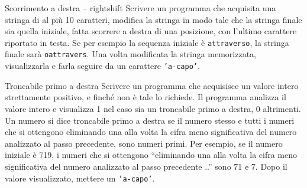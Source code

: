 \begin{labex}{Scorrimento a destra -- rightshift}
Scrivere un programma che acquisita una stringa di al pi\`u 10 caratteri, modifica la stringa in modo tale che la stringa finale sia quella iniziale, fatta scorrere a destra di una posizione, con l'ultimo carattere riportato in testa. Se per esempio la sequenza iniziale \`e \texttt{attraverso}, la stringa finale sar\`a \texttt{oattravers}. 
Una volta modificata la stringa memorizzata, visualizzarla e farla seguire da un carattere \texttt{'a-capo'}.

\begin{labexinout}
\end{labexinout}

\begin{labexcases}


\end{labexcases}


\end{labex}


\begin{labex}{Troncabile primo a destra}
Scrivere un programma che acquisisce un valore intero strettamente positivo, e finch\'e non \`e tale lo richiede. Il programma analizza il valore intero e visualizza 1 nel caso sia un troncabile primo a destra, 0 altrimenti.
Un numero si dice troncabile primo a destra se il numero stesso e tutti i numeri che si ottengono eliminando una alla volta la cifra meno significativa del numero analizzato al passo precedente, sono numeri primi.
Per esempio, se il numero iniziale \`e 719, i numeri che si ottengono ``eliminando una alla volta la cifra meno significativa del numero analizzato al passo precedente ..'' sono 71 e 7.
Dopo il valore visualizzato, mettere un \texttt{'a-capo'}.

\begin{labexinout}
\end{labexinout}

\begin{labexcases}



\end{labexcases}


\end{labex}

